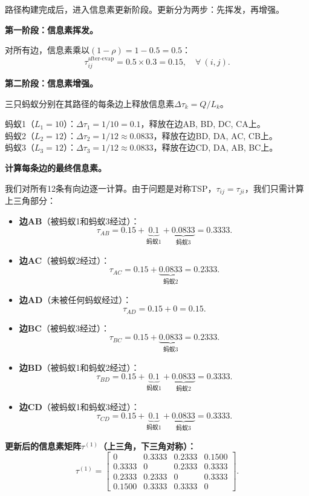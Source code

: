 \documentclass[lang=cn,zihao=-4,a4paper,fontset=windows]{beautybook}
\begin{document}
路径构建完成后，进入信息素更新阶段。更新分为两步：先挥发，再增强。

\textbf{第一阶段：信息素挥发。}

对所有边，信息素乘以$(1-\rho) = 1 - 0.5 = 0.5$：
\[
\tau_{ij}^{\text{after-evap}} = 0.5 \times 0.3 = 0.15, \quad \forall\ (i,j).
\]

\textbf{第二阶段：信息素增强。}

三只蚂蚁分别在其路径的每条边上释放信息素$\Delta\tau_k = Q/L_k$。

蚂蚁1（$L_1=10$）：$\Delta\tau_1 = 1/10 = 0.1$，释放在边AB, BD, DC, CA上。\\
蚂蚁2（$L_2=12$）：$\Delta\tau_2 = 1/12 \approx 0.0833$，释放在边BD, DA, AC, CB上。\\
蚂蚁3（$L_3=12$）：$\Delta\tau_3 = 1/12 \approx 0.0833$，释放在边CD, DA, AB, BC上。

\textbf{计算每条边的最终信息素。}

我们对所有12条有向边逐一计算。由于问题是对称TSP，$\tau_{ij} = \tau_{ji}$，我们只需计算上三角部分：

\begin{itemize}
    \item \textbf{边AB}（被蚂蚁1和蚂蚁3经过）：
    \[
    \tau_{AB} = 0.15 + \underbrace{0.1}_{\text{蚂蚁1}} + \underbrace{0.0833}_{\text{蚂蚁3}} = 0.3333.
    \]
    \item \textbf{边AC}（被蚂蚁2经过）：
    \[
    \tau_{AC} = 0.15 + \underbrace{0.0833}_{\text{蚂蚁2}} = 0.2333.
    \]
    \item \textbf{边AD}（未被任何蚂蚁经过）：
    \[
    \tau_{AD} = 0.15 + 0 = 0.15.
    \]
    \item \textbf{边BC}（被蚂蚁3经过）：
    \[
    \tau_{BC} = 0.15 + \underbrace{0.0833}_{\text{蚂蚁3}} = 0.2333.
    \]
    \item \textbf{边BD}（被蚂蚁1和蚂蚁2经过）：
    \[
    \tau_{BD} = 0.15 + \underbrace{0.1}_{\text{蚂蚁1}} + \underbrace{0.0833}_{\text{蚂蚁2}} = 0.3333.
    \]
    \item \textbf{边CD}（被蚂蚁1和蚂蚁3经过）：
    \[
    \tau_{CD} = 0.15 + \underbrace{0.1}_{\text{蚂蚁1}} + \underbrace{0.0833}_{\text{蚂蚁3}} = 0.3333.
    \]
\end{itemize}

\textbf{更新后的信息素矩阵$\tau^{(1)}$（上三角，下三角对称）：}
\[
\tau^{(1)} = \begin{bmatrix}
0 & 0.3333 & 0.2333 & 0.1500 \\
0.3333 & 0 & 0.2333 & 0.3333 \\
0.2333 & 0.2333 & 0 & 0.3333 \\
0.1500 & 0.3333 & 0.3333 & 0
\end{bmatrix}.
\]
\end{document}

